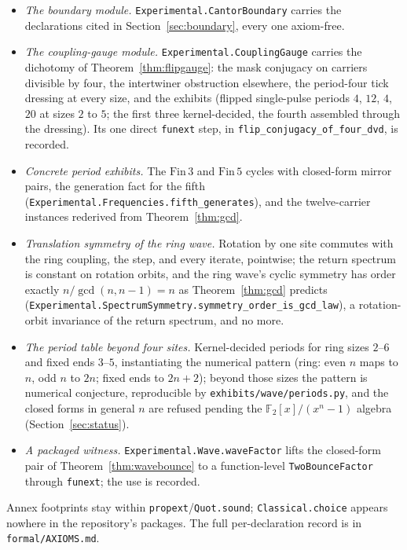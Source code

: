 \documentclass[11pt,a4paper]{article}
\theoremstyle{plain}
\theoremstyle{definition}
\theoremstyle{remark}
\begin{document}
\begin{itemize}
\item \emph{The boundary module.}
\texttt{Experimental.CantorBoundary} carries the declarations cited in
Section~\ref{sec:boundary}, every one axiom-free.
\item \emph{The coupling-gauge module.}
\texttt{Experimental.CouplingGauge} carries the dichotomy of
Theorem~\ref{thm:flipgauge}: the mask conjugacy on carriers divisible
by four, the intertwiner obstruction elsewhere, the period-four tick
dressing at every size, and the exhibits (flipped single-pulse
periods $4$, $12$, $4$, $20$ at sizes $2$ to $5$; the first three
kernel-decided, the fourth assembled through the dressing). Its one
direct \texttt{funext} step, in
\texttt{flip\_conjugacy\_of\_four\_dvd}, is recorded.
\item \emph{Concrete period exhibits.} The $\mathrm{Fin}\,3$ and
$\mathrm{Fin}\,5$ cycles with closed-form mirror pairs, the generation
fact for the fifth
(\texttt{Experimental.Frequencies.fifth\_generates}), and the
twelve-carrier instances rederived from Theorem~\ref{thm:gcd}.
\item \emph{Translation symmetry of the ring wave.} Rotation by one
site commutes with the ring coupling, the step, and every iterate,
pointwise; the return spectrum is constant on rotation orbits, and the
ring wave's cyclic symmetry has order exactly
$n/\gcd(n,n{-}1)=n$ as Theorem~\ref{thm:gcd} predicts
(\texttt{Experimental.SpectrumSymmetry.symmetry\_order\_is\_gcd\_law}),
a rotation-orbit invariance of the return spectrum, and no more.
\item \emph{The period table beyond four sites.} Kernel-decided
periods for ring sizes $2$--$6$ and fixed ends $3$--$5$, instantiating
the numerical pattern (ring: even $n$ maps to $n$, odd $n$ to $2n$;
fixed ends to $2n{+}2$); beyond those sizes the pattern is numerical
conjecture, reproducible by \texttt{exhibits/wave/periods.py}, and the
closed forms in general $n$ are refused pending the
$\mathbb{F}_2[x]/(x^n{-}1)$ algebra (Section~\ref{sec:status}).
\item \emph{A packaged witness.} \texttt{Experimental.Wave.waveFactor}
lifts the closed-form pair of Theorem~\ref{thm:wavebounce} to a
function-level \texttt{TwoBounceFactor} through \texttt{funext}; the
use is recorded.
\end{itemize}

\noindent
Annex footprints stay within \texttt{propext}/\texttt{Quot.sound};
\texttt{Classical.choice} appears nowhere in the repository's
packages. The full per-declaration record is in
\texttt{formal/AXIOMS.md}.
\end{document}
